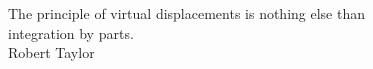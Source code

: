 
%
%
%

\thispagestyle{empty}
\vspace*{3.5cm}
\begin{center}

{\large
The principle of virtual displacements is nothing else than\\ integration by parts.\\
\vspace*{0.5cm}
Robert Taylor
}

\end{center}




